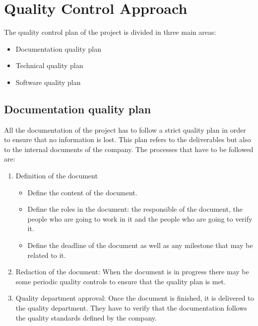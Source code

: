 \section{Quality Control Approach}


The quality control plan of the project is divided in three main areas:
\begin{itemize}
	\item Documentation quality plan
	\item Technical quality plan
	\item Software quality plan
\end{itemize}

\subsection{Documentation quality plan}
All the documentation of the project has to follow a strict quality plan in order to ensure that no information is lost. This plan refers to the deliverables but also to the internal documents of the company. The processes that have to be followed are:
\begin{enumerate}
	\item Definition of the document
	\begin{itemize}
		\item Define the content of the document.
		\item Define the roles in the document: the responsible of the document, the people who are going to work in it and the people who are going to verify it.
		\item Define the deadline of the document as well as any milestone that may be related to it.
	\end{itemize}
	\item Redaction of the document: When the document is in progress there may be some periodic quality controls to ensure that the quality plan is met.
	\item Quality department approval: Once the document is finished, it is delivered to the quality department. They have to verify that the documentation follows the quality standards defined by the company.
\end{enumerate}

